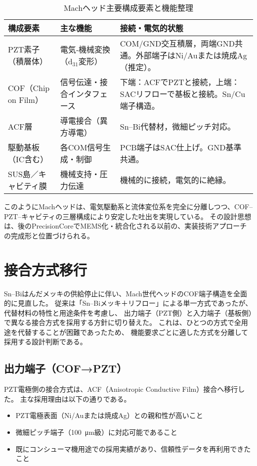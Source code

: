 \documentclass[conference]{IEEEtran}
\begin{document}
\begin{table}[t]
\centering
\footnotesize
\caption{Machヘッド主要構成要素と機能整理}
\label{tab:mach-structure}
\renewcommand{\arraystretch}{1.1}
\begin{tabularx}{\columnwidth}{@{}p{2.2cm} Y Y@{}}
\toprule
構成要素 & 主な機能 & 接続・電気的状態 \\
\midrule
PZT素子（積層体） & 電気‐機械変換（d$_{31}$変形） & COM/GND交互積層，両端GND共通。外部端子はNi/Auまたは焼成Ag（推定）。 \\
COF（Chip on Film） & 信号伝達・接合インタフェース & 下端：ACFでPZTと接続，上端：SACリフローで基板と接続。Sn/Cu端子構造。 \\
ACF層 & 導電接合（異方導電） & Sn–Bi代替材，微細ピッチ対応。 \\
駆動基板（IC含む） & 各COM信号生成・制御 & PCB端子はSAC仕上げ。GND基準共通。 \\
SUS島／キャビティ膜 & 機械支持・圧力伝達 & 機械的に接続，電気的に絶縁。 \\
\bottomrule
\end{tabularx}
\end{table}

このようにMachヘッドは、電気駆動系と流体変位系を完全に分離しつつ、COF–PZT–キャビティの三層構成により安定した吐出を実現している。  
その設計思想は、後のPrecisionCoreでMEMS化・統合化される以前の、実装技術アプローチの完成形と位置づけられる。

\section{接合方式移行}

Sn–Biはんだメッキの供給停止に伴い、Mach世代ヘッドのCOF端子構造を全面的に見直した。  
従来は「Sn–Biメッキ＋リフロー」による単一方式であったが、代替材料の特性と用途条件を考慮し、  
出力端子（PZT側）と入力端子（基板側）で異なる接合方式を採用する方針に切り替えた。  
これは、ひとつの方式で全用途を代替することが困難であったため、  
機能要求ごとに適した方式を分離して採用する設計判断である。

\subsection{出力端子（COF→PZT）}
PZT電極側の接合方式は、ACF（Anisotropic Conductive Film）接合へ移行した。  
主な採用理由は以下の通りである。

\begin{itemize}
  \item PZT電極表面（Ni/Auまたは焼成Ag）との親和性が高いこと  
  \item 微細ピッチ端子（\SI{100}{\micro m}級）に対応可能であること  
  \item 既にコンシューマ機用途での採用実績があり、信頼性データを再利用できたこと
\end{itemize}
\end{document}
